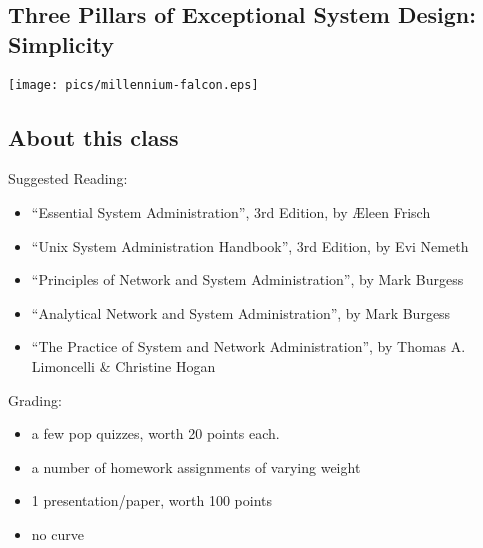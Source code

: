 \documentclass[xga]{xdvislides}
\begin{document}
\subsection{Three Pillars of Exceptional System Design: Simplicity}
\vspace*{\fill}
\begin{center}
    \texttt{[image: pics/millennium-falcon.eps]} \\
\end{center}
\vspace*{\fill}







\subsection{About this class}
Suggested Reading:
\begin{itemize}
	\item ``Essential System Administration'', 3rd Edition, by \AE leen
		Frisch
	\item ``Unix System Administration Handbook'', 3rd Edition, by Evi Nemeth
	\item ``Principles of Network and System Administration'', by Mark Burgess
	\item ``Analytical Network and System Administration'', by Mark Burgess
	\item ``The Practice of System and Network Administration'', by Thomas
		A. Limoncelli \& Christine Hogan
\end{itemize}
\addvspace{.5in}
Grading:
\begin{itemize}
	\item a few pop quizzes, worth 20 points each.
	\item a number of homework assignments of varying weight
	\item 1 presentation/paper, worth 100 points
	\item no curve
\end{itemize}
\end{document}
